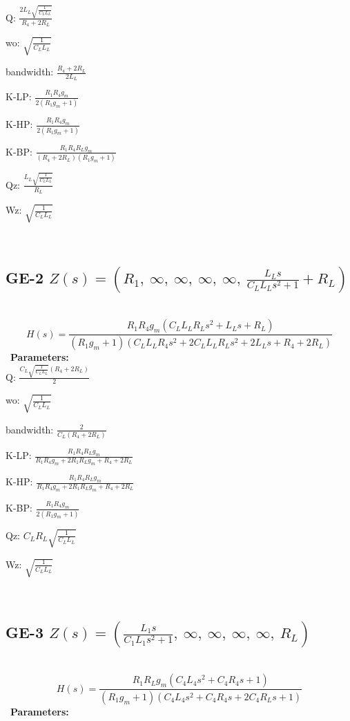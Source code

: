 \documentclass{article}
\begin{document}
Q: $\frac{2 L_{L} \sqrt{\frac{1}{C_{L} L_{L}}}}{R_{4} + 2 R_{L}}$\ 

wo: $\sqrt{\frac{1}{C_{L} L_{L}}}$\ 

bandwidth: $\frac{R_{4} + 2 R_{L}}{2 L_{L}}$\ 

K-LP: $\frac{R_{1} R_{4} g_{m}}{2 \left(R_{1} g_{m} + 1\right)}$\ 

K-HP: $\frac{R_{1} R_{4} g_{m}}{2 \left(R_{1} g_{m} + 1\right)}$\ 

K-BP: $\frac{R_{1} R_{4} R_{L} g_{m}}{\left(R_{4} + 2 R_{L}\right) \left(R_{1} g_{m} + 1\right)}$\ 

Qz: $\frac{L_{L} \sqrt{\frac{1}{C_{L} L_{L}}}}{R_{L}}$\ 

Wz: $\sqrt{\frac{1}{C_{L} L_{L}}}$\ 

\ 

\subsection{GE-2 $Z(s) = \left( R_{1}, \  \infty, \  \infty, \  \infty, \  \infty, \  \frac{L_{L} s}{C_{L} L_{L} s^{2} + 1} + R_{L}\right)$ } \ 
\textbf{\[H(s) = \frac{R_{1} R_{4} g_{m} \left(C_{L} L_{L} R_{L} s^{2} + L_{L} s + R_{L}\right)}{\left(R_{1} g_{m} + 1\right) \left(C_{L} L_{L} R_{4} s^{2} + 2 C_{L} L_{L} R_{L} s^{2} + 2 L_{L} s + R_{4} + 2 R_{L}\right)}\] } \ 
\textbf{Parameters:}\\ 

Q: $\frac{C_{L} \sqrt{\frac{1}{C_{L} L_{L}}} \left(R_{4} + 2 R_{L}\right)}{2}$\ 

wo: $\sqrt{\frac{1}{C_{L} L_{L}}}$\ 

bandwidth: $\frac{2}{C_{L} \left(R_{4} + 2 R_{L}\right)}$\ 

K-LP: $\frac{R_{1} R_{4} R_{L} g_{m}}{R_{1} R_{4} g_{m} + 2 R_{1} R_{L} g_{m} + R_{4} + 2 R_{L}}$\ 

K-HP: $\frac{R_{1} R_{4} R_{L} g_{m}}{R_{1} R_{4} g_{m} + 2 R_{1} R_{L} g_{m} + R_{4} + 2 R_{L}}$\ 

K-BP: $\frac{R_{1} R_{4} g_{m}}{2 \left(R_{1} g_{m} + 1\right)}$\ 

Qz: $C_{L} R_{L} \sqrt{\frac{1}{C_{L} L_{L}}}$\ 

Wz: $\sqrt{\frac{1}{C_{L} L_{L}}}$\ 

\ 

\subsection{GE-3 $Z(s) = \left( \frac{L_{1} s}{C_{1} L_{1} s^{2} + 1}, \  \infty, \  \infty, \  \infty, \  \infty, \  R_{L}\right)$ } \ 
\textbf{\[H(s) = \frac{R_{1} R_{L} g_{m} \left(C_{4} L_{4} s^{2} + C_{4} R_{4} s + 1\right)}{\left(R_{1} g_{m} + 1\right) \left(C_{4} L_{4} s^{2} + C_{4} R_{4} s + 2 C_{4} R_{L} s + 1\right)}\] } \ 
\textbf{Parameters:}\\ 
\end{document}
